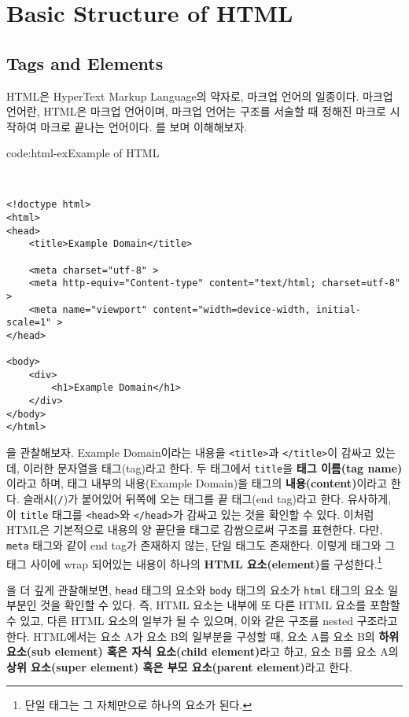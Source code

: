 \section{Basic Structure of HTML} \label{sect:basic-structure-of-html}

\subsection*{Tags and Elements}
HTML은 HyperText Markup Language의 약자로, 마크업 언어의 일종이다. 마크업 언어란, HTML은 마크업 언어이며, 마크업 언어는 구조를 서술할 때 정해진 마크로 시작하여 마크로 끝나는 언어이다. 를 보며 이해해보자.

\begin{codeenv}{code:html-ex}{Example of HTML}\begin{verbatim}


<!doctype html>
<html>
<head>
    <title>Example Domain</title>

    <meta charset="utf-8" >
    <meta http-equiv="Content-type" content="text/html; charset=utf-8" >
    <meta name="viewport" content="width=device-width, initial-scale=1" >
</head>

<body>
    <div>
        <h1>Example Domain</h1>
    </div>
</body>
</html>
\end{verbatim}
\end{codeenv}

을 관찰해보자. Example Domain이라는 내용을 \verb|<title>|과 \verb|</title>|이 감싸고 있는데, 이러한 문자열을 태그(tag)라고 한다. 두 태그에서 \verb|title|을 \textbf{태그 이름(tag name)}이라고 하며, 태그 내부의 내용(Example Domain)을 태그의 \textbf{내용(content)}이라고 한다. 슬래시(\verb|/|)가 붙어있어 뒤쪽에 오는 태그를 끝 태그(end tag)라고 한다. 유사하게, 이 \verb|title| 태그를 \verb|<head>|와 \verb|</head>|가 감싸고 있는 것을 확인할 수 있다. 이처럼 HTML은 기본적으로 내용의 양 끝단을 태그로 감쌈으로써 구조를 표현한다. 다만, \verb|meta| 태그와 같이 end tag가 존재하지 않는, 단일 태그도 존재한다. 이렇게 태그와 그 태그 사이에 wrap 되어있는 내용이 하나의 \textbf{HTML 요소(element)}를 구성한다.\footnote{단일 태그는 그 자체만으로 하나의 요소가 된다.}

을 더 깊게 관찰해보면, \verb|head| 태그의 요소와 \verb|body| 태그의 요소가 \verb|html| 태그의 요소 일부분인 것을 확인할 수 있다. 즉, HTML 요소는 내부에 또 다른 HTML 요소를 포함할 수 있고, 다른 HTML 요소의 일부가 될 수 있으며, 이와 같은 구조를 nested 구조라고 한다. HTML에서는 요소 A가 요소 B의 일부분을 구성할 때, 요소 A를 요소 B의 \textbf{하위 요소(sub element) 혹은 자식 요소(child element)}라고 하고, 요소 B를 요소 A의 \textbf{상위 요소(super element) 혹은 부모 요소(parent element)}라고 한다.

